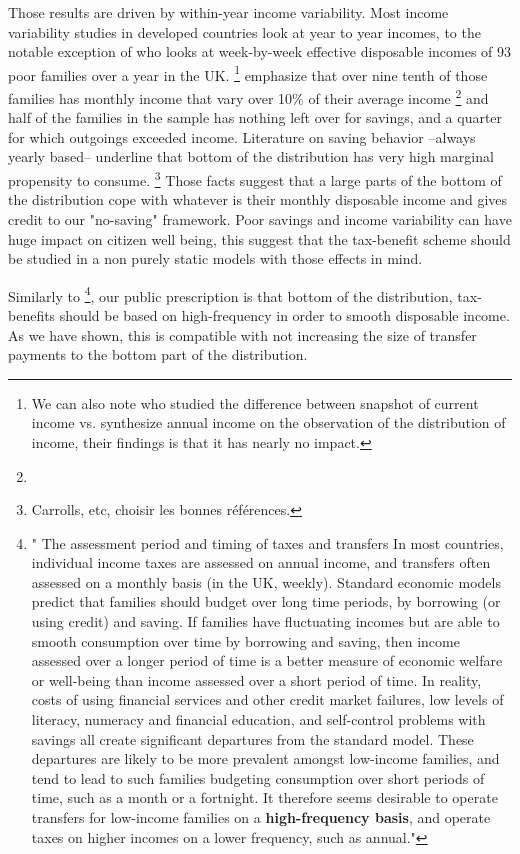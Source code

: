 Those results are driven by within-year income variability. Most income
variability studies in developed countries look at year to year incomes, to
the notable exception of \citet{Hills2006} who looks at week-by-week effective
disposable incomes of 93 poor families over a year in the UK. \footnote{We can
also note \citet{jenkins2000current} who studied the difference between
snapshot of current income vs. synthesize annual income on the observation of
the distribution of income, their findings is that it has nearly no impact.}
\citet{Hills2006} emphasize that over nine tenth of those families has monthly
income that vary over 10\% of their average income
\footnote{} and half of the families in the sample has nothing left
over for savings, and a quarter for which outgoings exceeded income.
Literature on saving behavior --always yearly based-- underline that bottom of
the distribution has very high marginal propensity to consume.
\footnote{Carrolls, etc, choisir les bonnes r\'{e}f\'{e}rences.} Those facts
suggest that a large parts of the bottom of the distribution cope with
whatever is their monthly disposable income and gives credit to our
"no-saving" framework. Poor savings and income variability can have huge
impact on citizen well being, this suggest that the tax-benefit scheme should
be studied in a non purely static models with those effects in mind.

Similarly to \citet{brewer2010means} \footnote{" The assessment period and
timing of taxes and transfers In most countries, individual income taxes are
assessed on annual income, and transfers often assessed on a monthly basis (in
the UK, weekly). Standard economic models predict that families should budget
over long time periods, by borrowing (or using credit) and saving. If families
have fluctuating incomes but are able to smooth consumption over time by
borrowing and saving, then income assessed over a longer period of time is a
better measure of economic welfare or well-being than income assessed over a
short period of time. In reality, costs of using financial services and other
credit market failures, low levels of literacy, numeracy and financial
education, and self-control problems with savings all create significant
departures from the standard model. These departures are likely to be more
prevalent amongst low-income families, and tend to lead to such families
budgeting consumption over short periods of time, such as a month or a
fortnight. It therefore seems desirable to operate transfers for low-income
families on a \textbf{high-frequency basis}, and operate taxes on higher
incomes on a lower frequency, such as annual."}, our public prescription is
that bottom of the distribution, tax-benefits should be based on
high-frequency in order to smooth disposable income. As we have shown, this is
compatible with not increasing the size of transfer payments to the bottom
part of the distribution.

